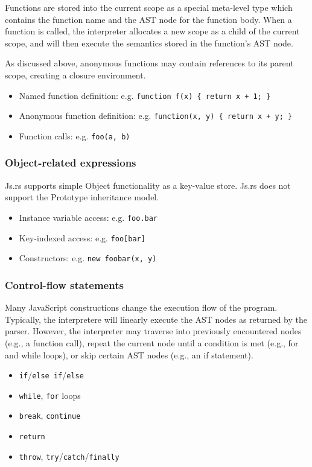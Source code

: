 \documentclass{article}
\begin{document}
\begin{multicols}{2}
Functions are stored into the current scope as a special meta-level type which
contains the function name and the AST node for the function body. When a
function is called, the interpreter allocates a new scope as a child of the
current scope, and will then execute the semantics stored in the function's
AST node. \newline

As discussed above, anonymous functions may contain references to its parent
scope, creating a closure environment.

\begin{itemize}
  \item Named function definition: e.g. \texttt{function f(x) \{ return x + 1; \} }
  \item Anonymous function definition: e.g. \texttt{function(x, y) \{ return x + y; \} }
  \item Function calls: e.g. \texttt{foo(a, b)}
\end{itemize}

\subsubsection*{Object-related expressions}

Js.rs supports simple Object functionality as a key-value store. Js.rs does not
support the Prototype inheritance model.

\begin{itemize}
  \item Instance variable access: e.g. \texttt{foo.bar}
  \item Key-indexed access: e.g. \texttt{foo[bar]}
  \item Constructors: e.g. \texttt{new foobar(x, y)}
\end{itemize}

\subsubsection*{Control-flow statements}

Many JavaScript constructions change the execution flow of the program.
Typically, the interpretere will linearly execute the AST nodes as returned by
the parser. However, the interpreter may traverse into previously encountered
nodes (e.g., a function call), repeat the current node until a condition is met
(e.g., for and while loops), or skip certain AST nodes (e.g., an if statement).

\begin{itemize}
  \item \texttt{if}/\texttt{else if}/\texttt{else}
  \item \texttt{while}, \texttt{for} loops
  \item \texttt{break}, \texttt{continue}
  \item \texttt{return}
  \item \texttt{throw}, \texttt{try}/\texttt{catch}/\texttt{finally}
\end{itemize}


\end{multicols}
\end{document}

